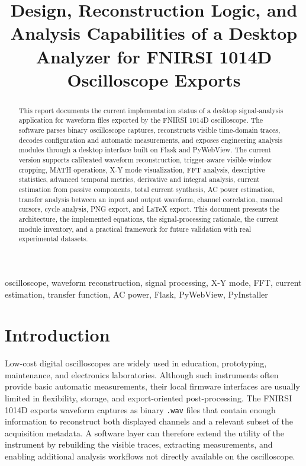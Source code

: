\documentclass[conference]{IEEEtran}
\title{Design, Reconstruction Logic, and Analysis Capabilities of a Desktop Analyzer for FNIRSI 1014D Oscilloscope Exports}
\author{
\IEEEauthorblockN{Project Technical Report}
\IEEEauthorblockA{
Repository documentation for the project\\
\texttt{fnirsi-1014d-oscilloscope-wav-analyzer}
}
}
\begin{document}
\maketitle

\begin{abstract}
This report documents the current implementation status of a desktop signal-analysis application for waveform files exported by the FNIRSI 1014D oscilloscope. The software parses binary oscilloscope captures, reconstructs visible time-domain traces, decodes configuration and automatic measurements, and exposes engineering analysis modules through a desktop interface built on Flask and PyWebView. The current version supports calibrated waveform reconstruction, trigger-aware visible-window cropping, MATH operations, X-Y mode visualization, FFT analysis, descriptive statistics, advanced temporal metrics, derivative and integral analysis, current estimation from passive components, total current synthesis, AC power estimation, transfer analysis between an input and output waveform, channel correlation, manual cursors, cycle analysis, PNG export, and LaTeX export. This document presents the architecture, the implemented equations, the signal-processing rationale, the current module inventory, and a practical framework for future validation with real experimental datasets.
\end{abstract}

\begin{IEEEkeywords}
oscilloscope, waveform reconstruction, signal processing, X-Y mode, FFT, current estimation, transfer function, AC power, Flask, PyWebView, PyInstaller
\end{IEEEkeywords}

\section{Introduction}
Low-cost digital oscilloscopes are widely used in education, prototyping, maintenance, and electronics laboratories. Although such instruments often provide basic automatic measurements, their local firmware interfaces are usually limited in flexibility, storage, and export-oriented post-processing. The FNIRSI 1014D exports waveform captures as binary \texttt{.wav} files that contain enough information to reconstruct both displayed channels and a relevant subset of the acquisition metadata. A software layer can therefore extend the utility of the instrument by rebuilding the visible traces, extracting measurements, and enabling additional analysis workflows not directly available on the oscilloscope.
\end{document}
